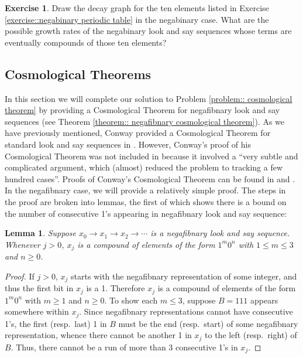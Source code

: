 \documentclass[reqno]{amsart}
\newtheorem{lemma}[theorem]{Lemma}
\theoremstyle{definition}
\newtheorem{exercise}[theorem]{Exercise}
\begin{document}
\begin{exercise}
    Draw the decay graph for the ten elements listed in Exercise \ref{exercise::negabinary periodic table} in the negabinary case. What are the possible growth rates of the negabinary look and say sequences whose terms are eventually compounds of those ten elements? 
\end{exercise}

\subsection{Cosmological Theorems} In this section we will complete our solution to Problem \ref{problem:: cosmological theorem} by providing a Cosmological Theorem for negafibnary look and say sequences (see Theorem \ref{theorem:: negafibnary cosmological theorem}). 
As we have previously mentioned, Conway provided a Cosmological Theorem for standard look and say sequences in \cite{Conway}. However, Conway's proof of his Cosmological Theorem was not included in \cite{Conway} because it involved a ``very subtle and complicated argument, which (almost) reduced the problem to tracking a few hundred cases''. Proofs of Conway's Cosmological Theorem can be found in \cite{Ekhad-Zeilberger} and \cite{Litherland}. In the negafibnary case, we will provide a relatively simple proof. The steps in the proof are broken into lemmas, the first of which shows there is a bound on the number of consecutive 1's appearing in negafibnary look and say sequence:



\begin{lemma}\label{lemma::negafibnary reduction of 1s}
    Suppose $x_0\to x_1\to x_2\to\cdots$ is a negafibnary look and say sequence. Whenever $j>0$, $x_j$ is a compound of elements of the form $1^{m}0^{n}$ with $1\leq m\leq 3$ and $n\geq 0$.
\end{lemma}

\begin{proof}
    If $j>0$, $x_j$ starts with the negafibnary representation of some integer, and thus the first bit in $x_j$ is a 1. Therefore $x_j$ is a compound of elements of the form $1^{m}0^{n}$ with $m\geq 1$ and $n\geq 0$. To show each $m\leq 3$, suppose $B=111$ appears somewhere within $x_j$. Since negafibnary representations cannot have consecutive 1's, the first (resp.~last) 1 in $B$ must be the end (resp.~start) of some negafibnary representation, whence there cannot be another 1 in $x_j$ to the left (resp.~right) of $B$. Thus, there cannot be a run of more than 3 consecutive 1's in $x_j$.
\end{proof}
\end{document}
